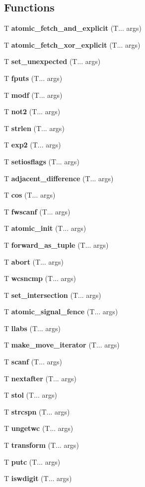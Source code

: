 \subsection*{Functions}
\begin{DoxyCompactItemize}
\item 
T \textbf{ atomic\+\_\+fetch\+\_\+and\+\_\+explicit} (T... args)
\item 
T \textbf{ atomic\+\_\+fetch\+\_\+xor\+\_\+explicit} (T... args)
\item 
T \textbf{ set\+\_\+unexpected} (T... args)
\item 
T \textbf{ fputs} (T... args)
\item 
T \textbf{ modf} (T... args)
\item 
T \textbf{ not2} (T... args)
\item 
T \textbf{ strlen} (T... args)
\item 
T \textbf{ exp2} (T... args)
\item 
T \textbf{ setiosflags} (T... args)
\item 
T \textbf{ adjacent\+\_\+difference} (T... args)
\item 
T \textbf{ cos} (T... args)
\item 
T \textbf{ fwscanf} (T... args)
\item 
T \textbf{ atomic\+\_\+init} (T... args)
\item 
T \textbf{ forward\+\_\+as\+\_\+tuple} (T... args)
\item 
T \textbf{ abort} (T... args)
\item 
T \textbf{ wcsncmp} (T... args)
\item 
T \textbf{ set\+\_\+intersection} (T... args)
\item 
T \textbf{ atomic\+\_\+signal\+\_\+fence} (T... args)
\item 
T \textbf{ llabs} (T... args)
\item 
T \textbf{ make\+\_\+move\+\_\+iterator} (T... args)
\item 
T \textbf{ scanf} (T... args)
\item 
T \textbf{ nextafter} (T... args)
\item 
T \textbf{ stol} (T... args)
\item 
T \textbf{ strcspn} (T... args)
\item 
T \textbf{ ungetwc} (T... args)
\item 
T \textbf{ transform} (T... args)
\item 
T \textbf{ putc} (T... args)
\item 
T \textbf{ iswdigit} (T... args)

\end{DoxyCompactItemize}
